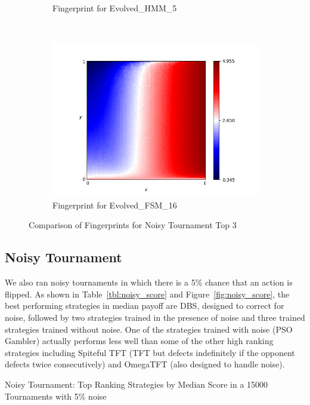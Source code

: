 \documentclass{article}
\begin{document}
\begin{figure}[!hbtp]
\begin{subfigure}[t]{.3\textwidth}
        \caption{Fingerprint for Evolved\_HMM\_5}
    \end{subfigure}%
    ~
    \begin{subfigure}[t]{.3\textwidth}
        \centering
        \includegraphics[width=\textwidth]{./assets/Evolved_FSM_16.png}
        \caption{Fingerprint for Evolved\_FSM\_16}
    \end{subfigure}%

    \caption{Comparison of Fingerprints for Noisy Tournament Top 3}
    \label{fig:comparison_fingerprint_noisy}
\end{figure}


\subsection{Noisy Tournament}

We also ran noisy tournaments in which there is a 5\% chance that an action is
flipped. As shown in Table~\ref{tbl:noisy_score} and
Figure~\ref{fig:noisy_score}, the best performing strategies in median payoff
are DBS, designed to correct for noise, followed by two strategies trained in
the presence of noise and three trained strategies trained without noise. One of
the strategies trained with noise (PSO Gambler) actually performs less well than
some of the other high ranking strategies including
Spiteful TFT (TFT but defects indefinitely if the opponent defects twice
consecutively) and OmegaTFT (also
designed to handle noise).

\begin{table}[!hbtp]
    \centering
        
        \caption{Noisy Tournament: Top Ranking Strategies by Median Score in a
        15000 Tournaments with 5\% noise}
        \label{tbl:noisy_score}
\end{table}
\end{document}
